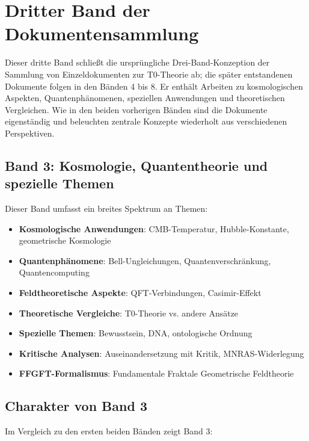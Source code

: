 \section*{Dritter Band der Dokumentensammlung}

Dieser dritte Band schließt die ursprüngliche Drei-Band-Konzeption der Sammlung von Einzeldokumenten zur T0-Theorie ab; die später entstandenen Dokumente folgen in den Bänden 4 bis 8. Er enthält Arbeiten zu kosmologischen Aspekten, Quantenphänomenen, speziellen Anwendungen und theoretischen Vergleichen. Wie in den beiden vorherigen Bänden sind die Dokumente eigenständig und beleuchten zentrale Konzepte wiederholt aus verschiedenen Perspektiven.

\subsection*{Band 3: Kosmologie, Quantentheorie und spezielle Themen}

Dieser Band umfasst ein breites Spektrum an Themen:

\begin{itemize}
\item \textbf{Kosmologische Anwendungen}: CMB-Temperatur, Hubble-Konstante, geometrische Kosmologie
\item \textbf{Quantenphänomene}: Bell-Ungleichungen, Quantenverschränkung, Quantencomputing
\item \textbf{Feldtheoretische Aspekte}: QFT-Verbindungen, Casimir-Effekt
\item \textbf{Theoretische Vergleiche}: T0-Theorie vs. andere Ansätze
\item \textbf{Spezielle Themen}: Bewusstsein, DNA, ontologische Ordnung
\item \textbf{Kritische Analysen}: Auseinandersetzung mit Kritik, MNRAS-Widerlegung
\item \textbf{FFGFT-Formalismus}: Fundamentale Fraktale Geometrische Feldtheorie
\end{itemize}

\subsection*{Charakter von Band 3}

Im Vergleich zu den ersten beiden Bänden zeigt Band 3:

